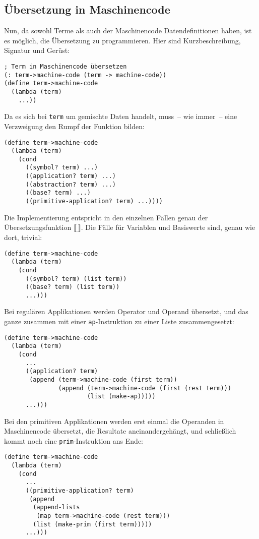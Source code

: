 \subsection{Übersetzung in Maschinencode}

Nun, da sowohl Terme als auch der Maschinencode Datendefinitionen
haben, ist es möglich, die Übersetzung zu programmieren.  Hier sind
Kurzbeschreibung, Signatur und Gerüst:
%
\begin{lstlisting}
; Term in Maschinencode übersetzen
(: term->machine-code (term -> machine-code))
(define term->machine-code
  (lambda (term)
    ...))
\end{lstlisting}
%
Da es sich bei \lstinline{term} um gemischte Daten handelt, muss~-- wie
immer~-- eine Verzweigung den Rumpf der Funktion bilden:
%
\begin{lstlisting}
(define term->machine-code
  (lambda (term)
    (cond
      ((symbol? term) ...)
      ((application? term) ...)
      ((abstraction? term) ...)
      ((base? term) ...)
      ((primitive-application? term) ...))))
\end{lstlisting}
%
Die Implementierung entspricht in den einzelnen Fällen genau der
Übersetzungsfunktion $\llbracket\underline{~}\rrbracket$. Die Fälle
für Variablen und Basiswerte sind, genau wie dort, trivial:
%
\begin{lstlisting}
(define term->machine-code
  (lambda (term)
    (cond
      ((symbol? term) (list term))
      ((base? term) (list term))
      ...)))
\end{lstlisting}
%
Bei regulären Applikationen werden
Operator und Operand übersetzt, und das ganze zusammen mit einer
\lstinline{ap}-Instruktion zu einer Liste zusammengesetzt:
%
\begin{lstlisting}
(define term->machine-code
  (lambda (term)
    (cond
      ...
      ((application? term)
       (append (term->machine-code (first term))
               (append (term->machine-code (first (rest term)))
                       (list (make-ap)))))
      ...)))
\end{lstlisting}
%
Bei den primitiven Applikationen werden erst einmal die Operanden in
Maschinencode übersetzt, die Resultate aneinandergehängt, und
schließlich kommt noch eine \lstinline{prim}-Instruktion ans Ende:
%
\begin{lstlisting}
(define term->machine-code
  (lambda (term)
    (cond
      ...
      ((primitive-application? term)
       (append
        (append-lists
         (map term->machine-code (rest term)))
        (list (make-prim (first term)))))
      ...)))
\end{lstlisting}
